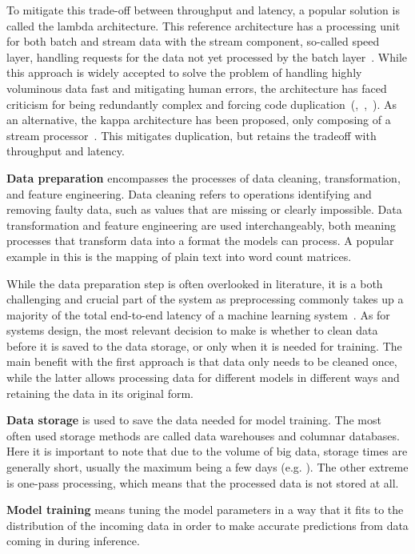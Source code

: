 To mitigate this trade-off between throughput and latency, a popular solution is called the lambda architecture. This reference architecture has a processing unit for both batch and stream data with the stream component, so-called speed layer, handling requests for the data not yet processed by the batch layer~\cite{beatingcap}. While this approach is widely accepted to solve the problem of handling highly voluminous data fast and mitigating human errors, the architecture has faced criticism for being redundantly complex and forcing code duplication~(\cite{questioninglambda},~\cite{uber},~\cite{facebook}). As an alternative, the kappa architecture has been proposed, only composing of a stream processor~\cite{questioninglambda}. This mitigates duplication, but retains the tradeoff with throughput and latency.

\textbf{Data preparation} encompasses the processes of data cleaning, transformation, and feature engineering. Data cleaning refers to operations identifying and removing faulty data, such as values that are missing or clearly impossible. Data transformation and feature engineering are used interchangeably, both meaning processes that transform data into a format the models can process. A popular example in this is the mapping of plain text into word count matrices.

While the data preparation step is often overlooked in literature,
it is a both challenging and crucial part of the system as preprocessing commonly takes up a majority of the total end-to-end latency of a machine learning system~\cite{adaptivelearningsystems}. As for systems design, the most relevant decision to make is whether to clean data before it is saved to the data storage, or only when it is  needed for training. The main benefit with the first approach is that data only needs to be cleaned once, while the latter allows processing data for different models in different ways and retaining the data in its original form.

\textbf{Data storage} is used to save the data needed for model training. The most often used storage methods are called data warehouses and columnar databases. Here it is important to note that due to the volume of big data, storage times are generally short, usually the maximum being a few days (e.g. \cite{uber}). The other extreme is one-pass processing, which means that the processed data is not stored at all.

\textbf{Model training} means tuning the model parameters in a way that it fits to the distribution of the incoming data in order to make accurate predictions from data coming in during inference.

